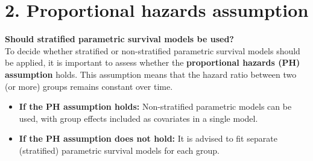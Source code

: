 \documentclass[
]{article}
\providecommand{\tightlist}{%
  \setlength{\itemsep}{0pt}\setlength{\parskip}{0pt}}
\begin{document}
\begin{table}[H]
\centering
\caption{\label{tab:Table_1}Observed survival data}
\centering
{}
\end{table}

\clearpage

\section{2. Proportional hazards
assumption}\label{proportional-hazards-assumption}

\textbf{Should stratified parametric survival models be used?}\\
To decide whether stratified or non-stratified parametric survival
models should be applied, it is important to assess whether the
\textbf{proportional hazards (PH) assumption} holds. This assumption
means that the hazard ratio between two (or more) groups remains
constant over time.

\begin{itemize}
\tightlist
\item
  \textbf{If the PH assumption holds:} Non-stratified parametric models
  can be used, with group effects included as covariates in a single
  model.\\
\item
  \textbf{If the PH assumption does not hold:} It is advised to fit
  separate (stratified) parametric survival models for each group.
\end{itemize}
\end{document}

